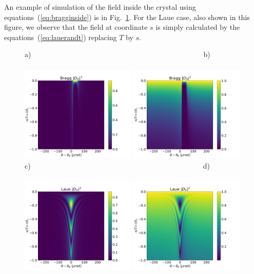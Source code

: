 \documentclass{iucr}
\begin{document}
An example of simulation of the field inside the crystal using equations~(\ref{eq:bragginside}) is in Fig.~\ref{fig:braggMap}. For the Laue case, also shown in this figure, we observe that the field at coordinate $s$ is simply calculated by the equations~(\ref{eq:lauerandt}) replacing $T$ by $s$.

\begin{figure}\label{fig:braggMap}
    \centering
    a)~~~~~~~~~~~~~~~~~~~~~~~~~~~~~~~~~~~~~~~~~~~~~~~~b)~~~~~~~~~~~~~~~~~~~~~~~~~~~~~~~~~~~~~~~~~~\\
    \includegraphics[width=0.49\textwidth]{figures/Bragg_DH.png}
    \includegraphics[width=0.49\textwidth]{figures/Bragg_D0.png}
    c)~~~~~~~~~~~~~~~~~~~~~~~~~~~~~~~~~~~~~~~~~~~~~~~~d)~~~~~~~~~~~~~~~~~~~~~~~~~~~~~~~~~~~~~~~~~\\
    \includegraphics[width=0.49\textwidth]{figures/Laue_DH.png}
    \includegraphics[width=0.49\textwidth]{figures/Laue_D0.png}

\end{figure}
\end{document}
